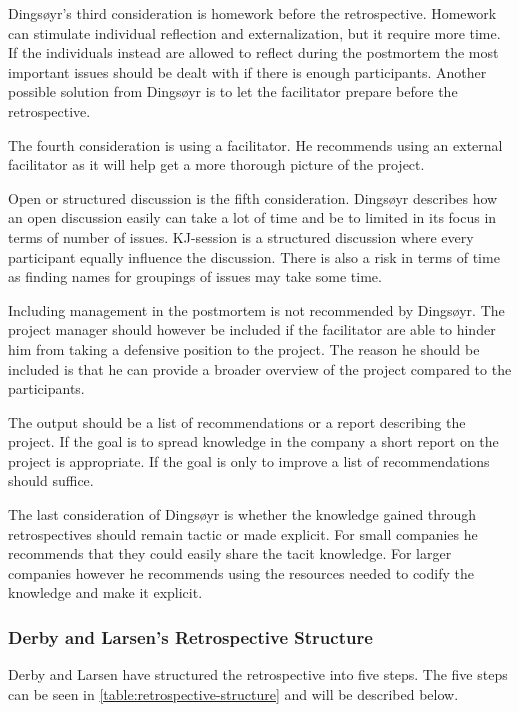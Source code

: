 Dingsøyr's third consideration is homework before the retrospective. Homework can stimulate individual reflection and externalization, but it require more time. If the individuals instead are allowed to reflect during the postmortem the most important issues should be dealt with if there is enough participants. Another possible solution from Dingsøyr is to let the facilitator prepare before the retrospective. 

The fourth consideration is using a facilitator. He recommends using an external facilitator as it will help get a more thorough picture of the project.

Open or structured discussion is the fifth consideration. Dingsøyr describes how an open discussion easily can take a lot of time and be to limited in its focus in terms of number of issues. KJ-session is a structured discussion where every participant equally influence the discussion. There is also a risk in terms of time as finding names for groupings of issues may take some time. 

Including management in the postmortem is not recommended by Dingsøyr. The project manager should however be included if the facilitator are able to hinder him from taking a defensive position to the project. The reason he should be included is that he can provide a broader overview of the project compared to the participants. 

The output should be a list of recommendations or a report describing the project. If the goal is to spread knowledge in the company a short report on the project is appropriate. If the goal is only to improve a list of recommendations should suffice. 

The last consideration of Dingsøyr is whether the knowledge gained through retrospectives should remain tactic or made explicit. For small companies he recommends that they could easily share the tacit knowledge. For larger companies however he recommends using the resources needed to codify the knowledge and make it explicit. 

\subsubsection{Derby and Larsen's Retrospective Structure}
Derby and Larsen \cite{Larsen2006} have structured the retrospective into five steps. The five steps can be seen in \autoref{table:retrospective-structure} and will be described below. 

